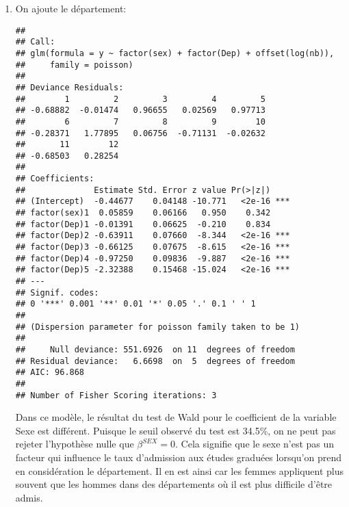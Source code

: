 \begin{solution}{6.5}
\begin{enumerate}
\item On ajoute le département:
\begin{knitrout}
\color{fgcolor}\begin{kframe}
\begin{alltt}
 \hlkwb{<-} \hlopt{~}\hlopt{+}\hlopt{+}\hlstd{(}
\end{alltt}
\begin{verbatim}
##
## Call:
## glm(formula = y ~ factor(sex) + factor(Dep) + offset(log(nb)),
##     family = poisson)
##
## Deviance Residuals:
##        1         2         3         4         5
## -0.68882  -0.01474   0.96655   0.02569   0.97713
##        6         7         8         9        10
## -0.28371   1.77895   0.06756  -0.71131  -0.02632
##       11        12
## -0.68503   0.28254
##
## Coefficients:
##              Estimate Std. Error z value Pr(>|z|)
## (Intercept)  -0.44677    0.04148 -10.771   <2e-16 ***
## factor(sex)1  0.05859    0.06166   0.950    0.342
## factor(Dep)1 -0.01391    0.06625  -0.210    0.834
## factor(Dep)2 -0.63911    0.07660  -8.344   <2e-16 ***
## factor(Dep)3 -0.66125    0.07675  -8.615   <2e-16 ***
## factor(Dep)4 -0.97250    0.09836  -9.887   <2e-16 ***
## factor(Dep)5 -2.32388    0.15468 -15.024   <2e-16 ***
## ---
## Signif. codes:
## 0 '***' 0.001 '**' 0.01 '*' 0.05 '.' 0.1 ' ' 1
##
## (Dispersion parameter for poisson family taken to be 1)
##
##     Null deviance: 551.6926  on 11  degrees of freedom
## Residual deviance:   6.6698  on  5  degrees of freedom
## AIC: 96.868
##
## Number of Fisher Scoring iterations: 3
\end{verbatim}
\end{kframe}
\end{knitrout}

Dans ce modèle, le résultat du test de Wald pour le coefficient de la variable Sexe est différent. Puisque le seuil observé du test est 34.5\%, on ne peut pas rejeter l'hypothèse nulle que $\beta^{SEX}=0$. Cela signifie que le sexe n'est pas un facteur qui influence le taux d'admission aux études graduées lorsqu'on prend en considération le département. Il en est ainsi car les femmes appliquent plus souvent que les hommes dans des départements où il est plus difficile d'être admis.


\end{enumerate}
\end{solution}
